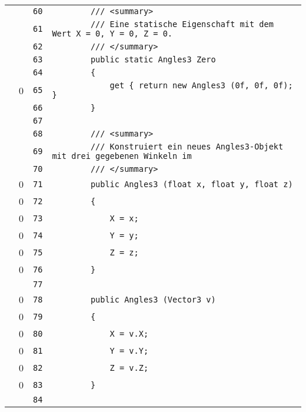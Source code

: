 \documentclass[a4paper,10pt]{article}
\begin{document}
\begin{longtable}[l]{lrrl}
\cellcolor{gray} &  & \verb~60~ & \verb~        /// <summary>~\\
\cellcolor{gray} &  & \verb~61~ & \verb~        /// Eine statische Eigenschaft mit dem Wert X = 0, Y = 0, Z = 0.~\\
\cellcolor{gray} &  & \verb~62~ & \verb~        /// </summary>~\\
\cellcolor{gray} &  & \verb~63~ & \verb~        public static Angles3 Zero~\\
\cellcolor{gray} &  & \verb~64~ & \verb~        {~\\
\cellcolor{red} & 0 & \verb~65~ & \verb~            get { return new Angles3 (0f, 0f, 0f); }~\\
\cellcolor{gray} &  & \verb~66~ & \verb~        }~\\
\cellcolor{gray} &  & \verb~67~ & \verb~~\\
\cellcolor{gray} &  & \verb~68~ & \verb~        /// <summary>~\\
\cellcolor{gray} &  & \verb~69~ & \verb~        /// Konstruiert ein neues Angles3-Objekt mit drei gegebenen Winkeln im~\\
\cellcolor{gray} &  & \verb~70~ & \verb~        /// </summary>~\\
\cellcolor{red} & 0 & \verb~71~ & \verb~        public Angles3 (float x, float y, float z)~\\
\cellcolor{red} & 0 & \verb~72~ & \verb~        {~\\
\cellcolor{red} & 0 & \verb~73~ & \verb~            X = x;~\\
\cellcolor{red} & 0 & \verb~74~ & \verb~            Y = y;~\\
\cellcolor{red} & 0 & \verb~75~ & \verb~            Z = z;~\\
\cellcolor{red} & 0 & \verb~76~ & \verb~        }~\\
\cellcolor{gray} &  & \verb~77~ & \verb~~\\
\cellcolor{red} & 0 & \verb~78~ & \verb~        public Angles3 (Vector3 v)~\\
\cellcolor{red} & 0 & \verb~79~ & \verb~        {~\\
\cellcolor{red} & 0 & \verb~80~ & \verb~            X = v.X;~\\
\cellcolor{red} & 0 & \verb~81~ & \verb~            Y = v.Y;~\\
\cellcolor{red} & 0 & \verb~82~ & \verb~            Z = v.Z;~\\
\cellcolor{red} & 0 & \verb~83~ & \verb~        }~\\
\cellcolor{gray} &  & \verb~84~ & \verb~~\\

\end{longtable}
\end{document}
